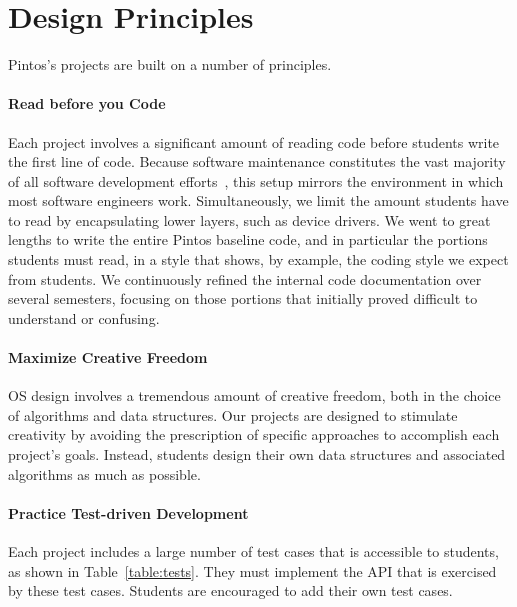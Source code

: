 \section{Design Principles}
\label{sec:designprinciples}

Pintos's projects are built on a number of principles.

\paragraph{Read before you Code}
Each project involves a significant amount of reading code before
students write the first line of code.
Because software maintenance constitutes the vast majority of all
software development efforts~\cite{Boehm1981Software}, this setup mirrors the 
environment in which most software engineers work.
Simultaneously, we limit the amount students have to read
by encapsulating lower layers, such as device drivers.
We went to great lengths to write the entire Pintos baseline code,
and in particular the portions students must read, in a style that shows,
by example, the coding style we expect from students.  
We continuously refined the internal code documentation over several
semesters, focusing on those 
portions that initially proved difficult to understand or confusing.

\paragraph{Maximize Creative Freedom}
OS design involves a tremendous amount of creative freedom, both in the
choice of algorithms and data structures.  Our projects are designed to
stimulate creativity by avoiding the prescription of specific approaches
to accomplish each project's goals.  Instead, students design their
own data structures and associated algorithms as much as possible.

\paragraph{Practice Test-driven Development}
Each project includes a large number of test cases that is accessible
to students, as shown in  Table~\ref{table:tests}.  
They must implement the API that is exercised by these test cases.  
Students are encouraged to add their own test cases.


